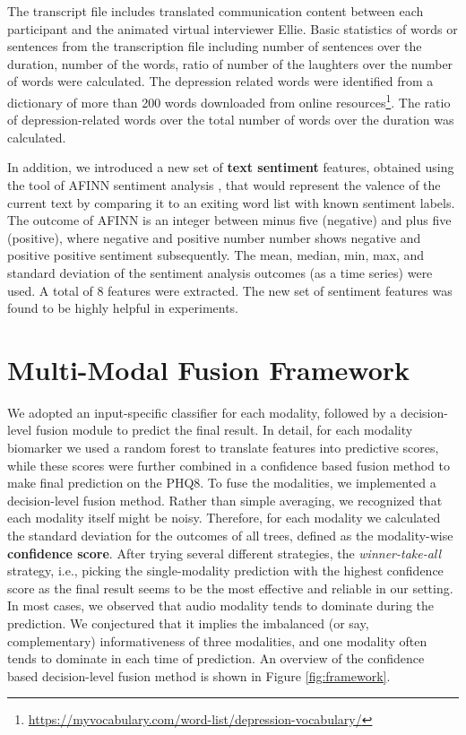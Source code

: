\documentclass[letterpaper]{article} %
\begin{document}
The transcript file includes translated communication content between each participant and the animated virtual interviewer Ellie. Basic statistics of words or sentences from the transcription file including number of sentences over the duration, number of the words, ratio of number of the laughters over the number of words were calculated. The depression related words were identified from a dictionary of more than 200 words downloaded from online resources\footnote{\url{https://myvocabulary.com/word-list/depression-vocabulary/}}. The ratio of depression-related words over the total number of words over the duration was calculated.

In addition, we introduced a new set of \textbf{text sentiment} features, obtained using the tool of AFINN sentiment analysis \cite{nielsen2011new}, that would represent the valence of the current text by comparing it to an exiting word list with known sentiment labels. The outcome of AFINN is an integer between minus five (negative) and plus five (positive), where negative and positive number number shows negative and positive positive sentiment subsequently. The mean, median, min, max, and standard deviation of the sentiment analysis outcomes (as a time series) were used. A total of 8 features were extracted. The new set of sentiment features was found to be highly helpful in experiments.

\vspace{-0.78mm}
\vspace{-1.48mm}
\section{Multi-Modal Fusion Framework}

We adopted an input-specific classifier for each modality, followed by a decision-level fusion module to predict the final result. In detail, for each modality biomarker we used a random forest to translate features into predictive scores, while these scores were further combined in a confidence based fusion method to make final prediction on the PHQ8. To fuse the modalities, we implemented a decision-level fusion method. Rather than simple averaging, we recognized that each modality itself might be noisy. Therefore, for each modality we calculated the standard deviation for the outcomes of all trees, defined as the modality-wise \textbf{confidence score}. After trying several different strategies, the \textit{winner-take-all} strategy, i.e., picking the single-modality prediction with the highest confidence score as the final result seems to be the most effective and reliable in our setting. In most cases, we observed that audio modality tends to dominate during the prediction. We conjectured that it implies the imbalanced (or say, complementary) informativeness of three modalities, and one modality often tends to dominate in each time of prediction. An overview of the confidence based decision-level fusion method is shown in Figure \ref{fig:framework}.
\end{document}
